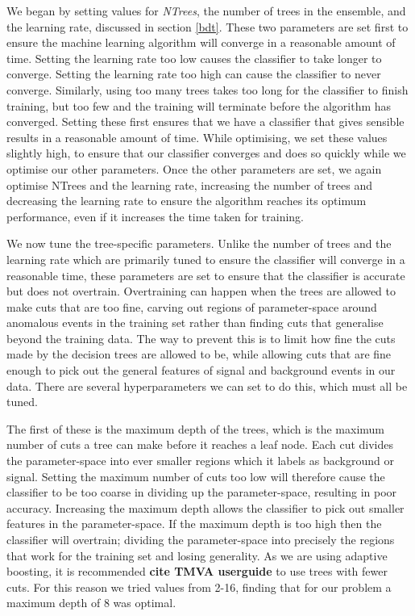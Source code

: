 \documentclass[12pt,twoside,a4paper]{report}
\begin{document}
We began by setting values for \textit{NTrees}, the number of trees in the ensemble, and the learning rate, discussed in section \ref{bdt}. These two parameters are set first to ensure the machine learning algorithm will converge in a reasonable amount of time. Setting the learning rate  too low causes the classifier to take longer to converge. Setting the learning rate too high can cause the classifier to never converge. Similarly, using too many trees takes too long for the classifier to finish training, but too few and the training will terminate before the algorithm has converged. Setting these first ensures that we have a classifier that gives sensible results in a reasonable amount of time. While optimising, we set these values slightly high, to ensure that our classifier converges and does so quickly while we optimise our other parameters. Once the other parameters are set, we again optimise NTrees and the learning rate, increasing the number of trees and decreasing the learning rate to ensure the algorithm reaches its optimum performance, even if it increases the time taken for training.

We now tune the tree-specific parameters. Unlike the number of trees and the learning rate which are primarily tuned to ensure the classifier will converge in a reasonable time, these parameters are set to ensure that the classifier is accurate but does not overtrain. Overtraining can happen when the trees are allowed to make cuts that are too fine, carving out regions of parameter-space around anomalous events in the training set rather than finding cuts that generalise beyond the training data. The way to prevent this is to limit how fine the cuts made by the decision trees are allowed to be, while allowing cuts that are fine enough to pick out the general features of signal and background events in our data. There are several hyperparameters we can set to do this, which must all be tuned. 

The first of these is the maximum depth of the trees, which is the maximum number of cuts a tree can make before it reaches a leaf node. Each cut divides the parameter-space into ever smaller regions which it labels as background or signal. Setting the maximum number of cuts too low will therefore cause the classifier to be too coarse in dividing up the parameter-space, resulting in poor accuracy. Increasing the maximum depth allows the classifier to pick out smaller features in the parameter-space. If the maximum depth is too high then the classifier will overtrain; dividing the parameter-space into precisely the regions that work for the training set and losing generality. As we are using adaptive boosting, it is recommended \textbf{cite TMVA userguide} to use trees with fewer cuts. For this reason we tried values from 2-16, finding that for our problem a maximum depth of 8 was optimal. 
\end{document}
